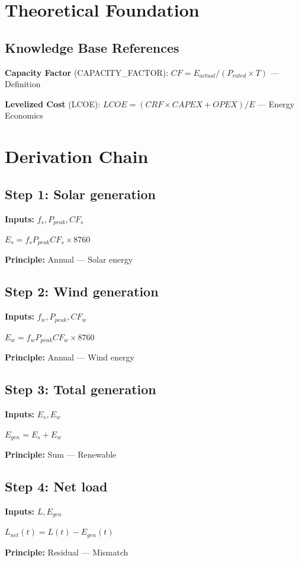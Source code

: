 \documentclass[11pt,twocolumn]{article}
\begin{document}
\section{Theoretical Foundation}

\subsection{Knowledge Base References}
\textbf{Capacity Factor} (CAPACITY_FACTOR): $CF = E_{actual} / (P_{rated} \times T)$ --- Definition

\textbf{Levelized Cost} (LCOE): $LCOE = (CRF \times CAPEX + OPEX) / E$ --- Energy Economics


\section{Derivation Chain}

\subsection*{Step 1: Solar generation}
\textbf{Inputs:} $f_s, P_{peak}, CF_s$

$E_s = f_s P_{peak} CF_s \times 8760$

\textbf{Principle:} Annual --- Solar energy

\subsection*{Step 2: Wind generation}
\textbf{Inputs:} $f_w, P_{peak}, CF_w$

$E_w = f_w P_{peak} CF_w \times 8760$

\textbf{Principle:} Annual --- Wind energy

\subsection*{Step 3: Total generation}
\textbf{Inputs:} $E_s, E_w$

$E_{gen} = E_s + E_w$

\textbf{Principle:} Sum --- Renewable

\subsection*{Step 4: Net load}
\textbf{Inputs:} $L, E_{gen}$

$L_{net}(t) = L(t) - E_{gen}(t)$

\textbf{Principle:} Residual --- Mismatch
\end{document}
